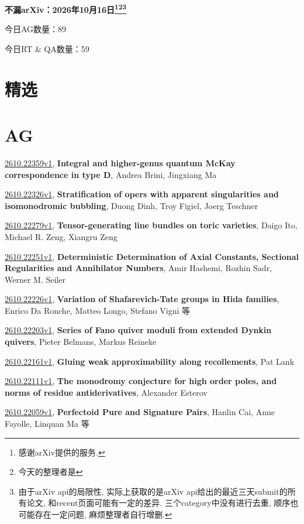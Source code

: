 \documentclass[9pt, a4paper]{article}
\theoremstyle{plain}
\theoremstyle{definition}
\theoremstyle{remark}
\newcommand{\arxiv}[3]{\href{https://arxiv.org/abs/#1}{#1}, \textbf{\textcolor{arxivblue}{#2}}, #3}
\newcommand{\AGnumber}{89}
\newcommand{\RTQAnumber}{59}
\newcommand{\NewestDate}{2026年10月16日}
\newcommand{\todayarXiver}{} %
\begin{document}
\begin{center}
    \Huge\textbf{不漏arXiv：\NewestDate\footnote{感谢arXiv提供的服务.}\footnote{今天的整理者是\todayarXiver}\footnote{由于arXiv api的局限性, 实际上获取的是arXiv api给出的最近三天submit的所有论文, 和recent页面可能有一定的差异. 三个category中没有进行去重, 顺序也可能存在一定问题, 麻烦整理者自行增删.}} \\
\end{center}

\setcounter{section}{-1}

\begin{center}
    今日AG数量：\AGnumber
    
    今日RT \& QA数量：\RTQAnumber
    
\end{center}


\section{精选}


\section{AG}
\arxiv{2610.22359v1}{Integral and higher-genus quantum McKay correspondence in type D}{Andrea Brini, Jingxiang Ma}

\arxiv{2610.22326v1}{Stratification of opers with apparent singularities and isomonodromic bubbling}{Duong Dinh, Troy Figiel, Joerg Teschner}

\arxiv{2610.22279v1}{Tensor-generating line bundles on toric varieties}{Daigo Ito, Michael R. Zeng, Xiangru Zeng}

\arxiv{2610.22251v1}{Deterministic Determination of Axial Constants, Sectional Regularities and Annihilator Numbers}{Amir Hashemi, Rozhin Sadr, Werner M. Seiler}

\arxiv{2610.22226v1}{Variation of Shafarevich-Tate groups in Hida families}{Enrico Da Ronche, Matteo Longo, Stefano Vigni 等}

\arxiv{2610.22203v1}{Series of Fano quiver moduli from extended Dynkin quivers}{Pieter Belmans, Markus Reineke}

\arxiv{2610.22161v1}{Gluing weak approximability along recollements}{Pat Lank}

\arxiv{2610.22111v1}{The monodromy conjecture for high order poles, and norms of residue antiderivatives}{Alexander Esterov}

\arxiv{2610.22059v1}{Perfectoid Pure and Signature Pairs}{Hanlin Cai, Anne Fayolle, Linquan Ma 等}
\end{document}
